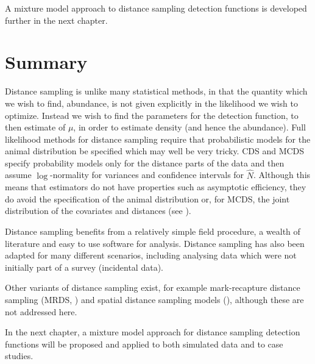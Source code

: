 A mixture model approach to distance sampling detection functions is developed further in the next chapter.

\section{Summary}
\label{cor-7s13}
Distance sampling is unlike many statistical methods, in that the quantity which we wish to find, abundance, is not given explicitly in the likelihood we wish to optimize. Instead we wish to find the parameters for the detection function, to then estimate of $\mu$, in order to estimate density (and hence the abundance). Full likelihood methods for distance sampling require that probabilistic models for the animal distribution be specified which may well be very tricky. CDS and MCDS specify probability models only for the distance parts of the data and then assume $\log$-normality for variances and confidence intervals for $\hat{N}$. Although this means that estimators do not have  properties such as asymptotic efficiency, they do avoid the specification of the animal distribution or, for MCDS, the joint distribution of the covariates and distances (see \cite[p. 6 and pp. 31-33]{ADS}). 

Distance sampling benefits from a relatively simple field procedure, a wealth of literature and easy to use software for analysis. Distance sampling has also been adapted for many different scenarios, including analysing data which were\label{cor-r1-7} not initially part of a survey (incidental data).

Other variants of distance sampling exist, for example mark-recapture distance sampling (MRDS, \cite{mrdspaper}) and spatial distance sampling models (\cite[chapter 4]{ADS}), although these are not addressed here.

In the next chapter, a mixture model approach for distance sampling detection functions will be proposed and applied to both simulated data and to case studies.
